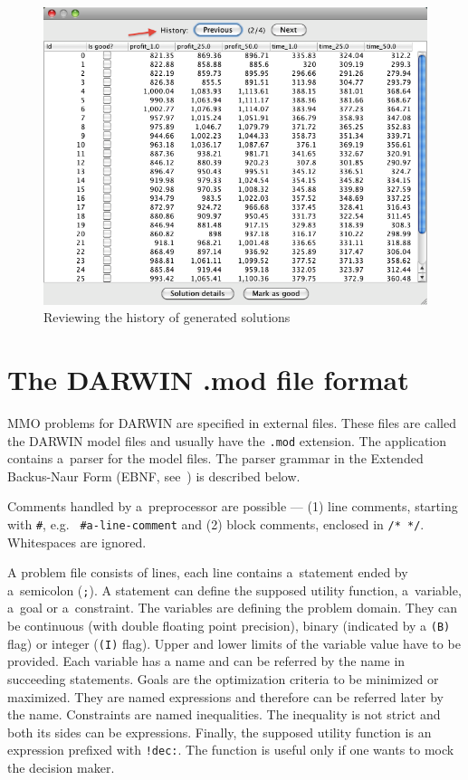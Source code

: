 \begin{figure}
  \centering
  \includegraphics[scale=0.7]{img/manual/10_history}
  \caption{Reviewing the history of generated solutions}
  \label{manual_10_history}
\end{figure}

\clearpage{}
\section*{The DARWIN .mod file format}

MMO problems for DARWIN are specified in external files. These files are
called the DARWIN model files and usually have the \texttt{.mod}
extension. The application contains a~parser for the model files. The parser
grammar in the Extended Backus-Naur Form (EBNF, see~\cite{Wir77}) is described
below.



Comments handled by a~preprocessor are possible --- (1) line comments,
starting with \texttt{\#}, e.g. \texttt{ \#a-line-comment} and (2) block
comments, enclosed in \texttt{/* */}. Whitespaces are ignored.

A problem file consists of lines, each line contains a~statement ended by
a~semicolon (\texttt{;}). A statement can define the supposed utility
function, a~variable, a~goal or a~constraint. The variables are defining the
problem domain. They can be continuous (with double floating point precision),
binary (indicated by a \texttt{(B)} flag) or integer (\texttt{(I)} flag).
Upper and lower limits of the variable value have to be provided. Each
variable has a name and can be referred by the name in succeeding
statements. Goals are the optimization criteria to be minimized or
maximized. They are named expressions and therefore can be referred later by
the name. Constraints are named inequalities. The inequality is not strict and
both its sides can be expressions. Finally, the supposed utility function is
an expression prefixed with \texttt{!dec:}. The function is useful only if one
wants to mock the decision maker.

